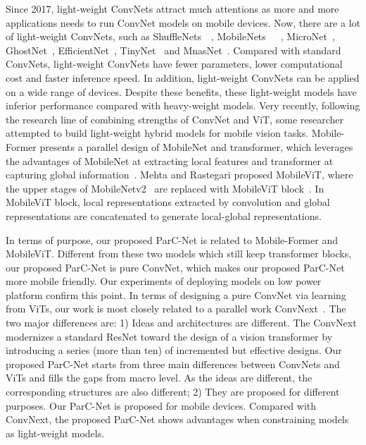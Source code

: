\documentclass[10pt,twocolumn,letterpaper]{article}
\begin{document}
Since 2017, light-weight ConvNets attract much attentions as more and more applications needs to run ConvNet models on mobile devices. Now, there are a lot of light-weight ConvNets, such as ShuffleNets~\cite{ma2018shufflenet}~\cite{ma2018shufflenet}, MobileNets~\cite{howard2017mobilenets}~\cite{sandler2018mobilenetv2}~\cite{howard2019searching}, MicroNet~\cite{li2021micronet}, GhostNet~\cite{han2020ghostnet}, EfficientNet~\cite{tan2019efficientnet}, TinyNet~\cite{chen2019tinynet} and MnasNet~\cite{tan2019mnasnet}. Compared with standard ConvNets, light-weight ConvNets have fewer parameters, lower computational cost and faster inference speed. In addition, light-weight ConvNets can  be applied on a wide range of devices. Despite these benefits, these light-weight models have inferior performance compared with heavy-weight models. Very recently, following the research line of combining strengths of ConvNet and ViT, some researcher attempted to build light-weight hybrid models for mobile vision tasks. Mobile-Former presents a parallel design of MobileNet and transformer, which leverages the advantages of MobileNet at extracting local features and transformer at capturing global information~\cite{chen2021mobile}. Mehta and Rastegari proposed MobileViT, where the upper stages of MobileNetv2~\cite{sandler2018mobilenetv2} are replaced with MobileViT block~\cite{mehta2022mobilevit}. In MobileViT block, local representations extracted by convolution and global representations are concatenated to generate local-global representations. 

In terms of purpose, our proposed ParC-Net is related to Mobile-Former and MobileViT. Different from these two models which still keep transformer blocks, our proposed ParC-Net is pure ConvNet, which makes our proposed ParC-Net more mobile friendly. Our experiments of deploying models on low power platform confirm this point. In terms of designing a pure ConvNet via learning from ViTs, our work is most closely related to a parallel work ConvNext~\cite{liu2022convnet}. The two major differences are: 1) Ideas and architectures are different. The ConvNext modernizes a standard ResNet toward the design of a vision transformer by introducing a series (more than ten) of incremented but effective designs. Our proposed ParC-Net starts from three main differences between ConvNets and ViTs and fills the gaps from macro level. As the ideas are different, the corresponding structures are also different; 2) They are proposed for different purposes. Our ParC-Net is proposed for mobile devices. Compared with ConvNext, the proposed ParC-Net shows advantages when constraining models as light-weight models. 
\end{document}
